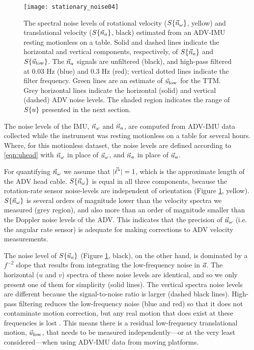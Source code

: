 \begin{figure}
  \centering
  \texttt{[image: stationary\_noise04]}
  \caption{The spectral noise levels of rotational velocity ($S\{\vec{n}_{\omega}\}$, yellow) and translational velocity ($S\{\vec{n}_{a}\}$, black) estimated from an ADV-IMU resting motionless on a table. Solid and dashed lines indicate the horizontal and vertical components, respectively, of $S\{\vec{n}_{a}\}$ and $S\{\vec{u}_\mathrm{low}\}$. The $\vec{n}_{a}$ signals are unfiltered (black), and high-pass filtered at 0.03 Hz (blue) and 0.3 Hz (red); vertical dotted lines indicate the filter frequency.  Green lines are an estimate of $\vec{u}_\mathrm{low}$ for the TTM. Grey horizontal lines indicate the horizontal (solid) and vertical (dashed) ADV noise levels. The shaded region indicates the range of $S\{u\}$ presented in the next section.}
  \label{fig:stnoise}
\end{figure}

The noise levels of the IMU, $\vec{n}_{\omega}$ and $\vec{n}_{a}$, are computed from ADV-IMU data collected while the instrument was resting motionless on a table for several hours. Where, for this motionless dataset, the noise levels are defined according to \eqref{eqn:uhead} with $\vec{n}_{\omega}$ in place of $\vec{u}_\omega$, and $\vec{n}_{a}$ in place of $\vec{u}_a$.  

For quantifying $\vec{n}_{\omega}$ we assume that $|\vec{\ell}^*| = 1$, which is the approximate length of the ADV head cable. $S\{\vec{n}_{\omega}\}$ is equal in all three components, because the rotation-rate sensor noise-levels are independent of orientation (Figure \ref{fig:stnoise}, yellow). $S\{\vec{n}_{\omega}\}$ is several orders of magnitude lower than the velocity spectra we measured (grey region), and also more than an order of magnitude smaller than the Doppler noise levels of the ADV. This indicates that the precision of $\vec{u}_\omega$ (i.e. the angular rate sensor) is adequate for making corrections to ADV velocity measurements.

The noise level of $S\{\vec{u}_a\}$ (Figure \ref{fig:stnoise}, black), on the other hand, is dominated by a $f^{-2}$ slope that results from integrating the low-frequency noise in ${\vec{a}}$. The horizontal ($u$ and $v$) spectra of these noise levels are identical, and so we only present one of them for simplicity (solid lines). The vertical spectra noise levels are different because the signal-to-noise ratio is larger (dashed black lines). High-pass filtering reduces the low-frequency noise (blue and red) so that it does not contaminate motion correction, but any real motion that does exist at these frequencies is lost \cite[]{EgelandPhD2014, VanZwieten++2015}. This means there is a residual low-frequency translational motion, $\vec{u}_\mathrm{low}$, that needs to be measured independently---or at the very least considered---when using ADV-IMU data from moving platforms. 


